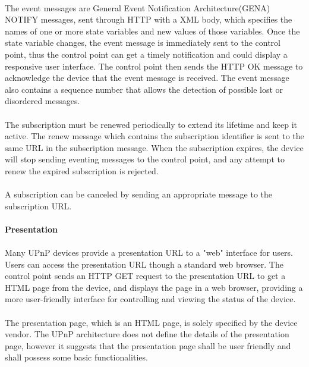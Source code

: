 \\
The event messages are General Event Notification Architecture(GENA) NOTIFY 
messages, sent through HTTP with a XML body, which specifies the names of one or 
more state variables and new values of those variables. Once the state variable 
changes, the event message is immediately sent to the control point, thus the 
control point can get a timely notification and could display a responsive user 
interface. The control point then sends the HTTP OK message to acknowledge the device 
that the event message is received. The event message also contains a sequence 
number that allows the detection of possible lost or disordered messages. \\
\\
The subscription must be renewed periodically to extend its lifetime and keep it active. The renew 
message which contains the subscription identifier is sent to the same URL in the subscription 
message. When the subscription expires, the device will stop sending eventing messages to the 
control point, and any attempt to renew the expired subscription is rejected. \\
\\
A subscription can be canceled by sending an appropriate message to the
subscription URL. \\
\\
\textbf{Presentation} \\
\\ 
Many UPnP devices provide a presentation URL to a "web" interface for users. Users can access the 
presentation URL though a standard web browser. The control point sends an HTTP GET request to the 
presentation URL to get a HTML page from the device, and displays the page in a web browser, 
providing a more user-friendly interface for controlling and viewing the status
of the device. \\
\\
The presentation page, which is an HTML page, is solely specified by the device vendor.
The UPnP architecture does not define the details of the presentation page,
however it suggests that the presentation page shall be user friendly and shall
possess some basic functionalities.
